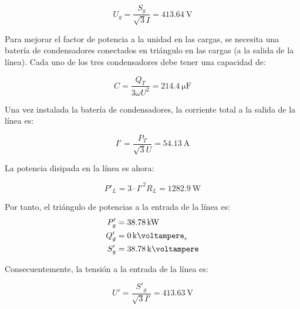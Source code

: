\documentclass[10pt]{article}
\begin{document}
\[
  U_g = \frac{S_g}{\sqrt{3} I} = \SI{413.64}{\volt}
\]

Para mejorar el factor de potencia a la unidad en las cargas, se
necesita una batería de condensadores conectados en triángulo en las
cargas (a la salida de la línea). Cada uno de los tres condensadores
debe tener una capacidad de:

\[
  C = \frac{Q_T}{3 \omega U^2} = \SI{214.4}{\micro\farad}
\]

Una vez instalada la batería de condensadores, la corriente total a la
salida de la línea es:

\[
  I' = \frac{P_T}{\sqrt{3} U} = \SI{54.13}{\ampere}
\]

La potencia disipada en la línea es ahora:

\[
  P'_L = 3 \cdot I'^2 R_L = \SI{1282.9}{\watt}
\]

Por tanto, el triángulo de potencias a la entrada de la línea es:
\begin{align*}
  P'_g &= \SI{38.78}{\kilo\watt}\\
  Q'_g &= \SI{0}{\kilo\voltampere}_r\\
  S'_g &= \SI{38.78}{\kilo\voltampere}
\end{align*}

Consecuentemente, la tensión a la entrada de la línea es:

\[
  U' = \frac{S'_g}{\sqrt{3} I'} = \SI{413.63}{\volt}
\]
\end{document}
